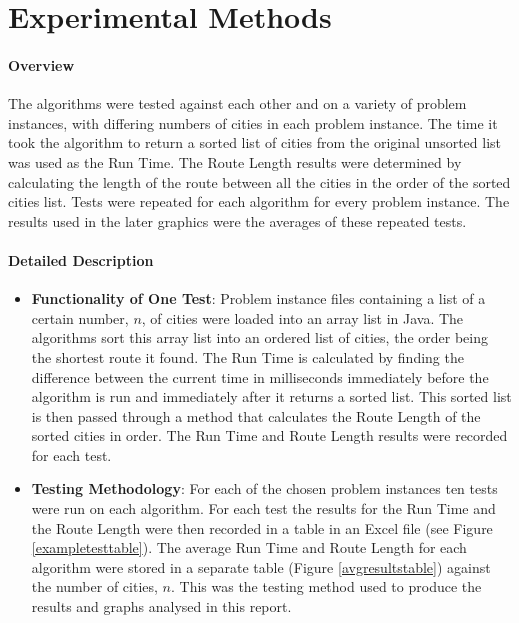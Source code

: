 \documentclass[conference,backref=page]{acmsiggraph}
\begin{document}
\section{Experimental Methods}

\paragraph{Overview}
The algorithms were tested against each other and on a variety of problem instances, with differing numbers of cities in each problem instance. The time it took the algorithm to return a sorted list of cities from the original unsorted list was used as the Run Time. The Route Length results were determined by calculating the length of the route between all the cities in the order of the sorted cities list. Tests were repeated for each algorithm for every problem instance. The results used in the later graphics were the averages of these repeated tests.

\paragraph{Detailed Description}
\begin{itemize}
\item {\bf Functionality of One Test}: Problem instance files containing a list of a certain number, $n$, of cities were loaded into an array list in Java. The algorithms sort this array list into an ordered list of cities, the order being the shortest route it found. The Run Time is calculated by finding the difference between the current time in milliseconds immediately before the algorithm is run and immediately after it returns a sorted list. This sorted list is then passed through a method that calculates the Route Length of the sorted cities in order. The Run Time and Route Length results were recorded for each test.
\item {\bf Testing Methodology}: For each of the chosen problem instances ten tests were run on each algorithm. For each test the results for the Run Time and the Route Length were then recorded in a table in an Excel file (see Figure \ref{exampletesttable}). The average Run Time and Route Length for each algorithm were stored in a separate table (Figure \ref{avgresultstable}) against the number of cities, $n$. This was the testing method used to produce the results and graphs analysed in this report.
\end{itemize}
\end{document}
